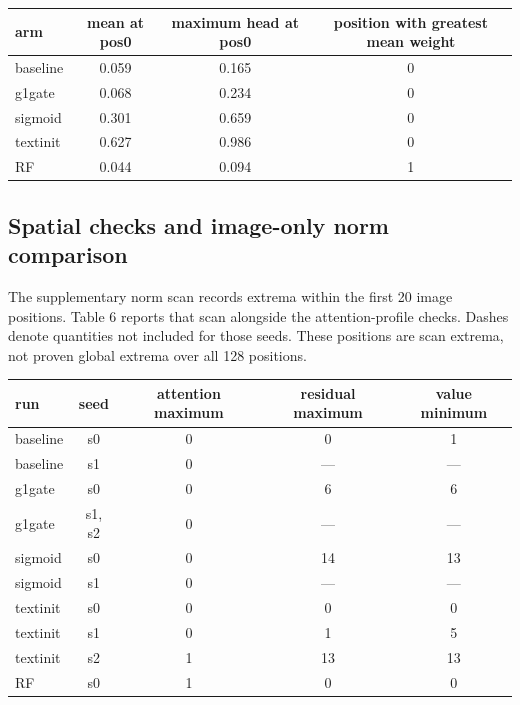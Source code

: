 \documentclass{article}
\begin{document}
\begin{center}
\begin{minipage}{\linewidth}
\makeatletter{}\makeatother
  \centering
  \small
  \caption{\textbf{Raw first-position attention in checkpoint reprobes, seed 0.}}
  \begin{tabular}{lccc}
    \toprule
    arm & mean at pos0 & maximum head at pos0 & position with greatest mean weight \\
    \midrule
    baseline & 0.059 & 0.165 & 0 \\
    g1gate & 0.068 & 0.234 & 0 \\
    sigmoid & 0.301 & 0.659 & 0 \\
    textinit & 0.627 & 0.986 & 0 \\
    RF & 0.044 & 0.094 & 1 \\
    \bottomrule
  \end{tabular}
\end{minipage}
\end{center}

\subsection{Spatial checks and image-only norm comparison}

The supplementary norm scan records extrema within the first 20 image positions. Table 6 reports that scan alongside the attention-profile checks. Dashes denote quantities not included for those seeds. These positions are scan extrema, not proven global extrema over all 128 positions.

\begin{center}
\begin{minipage}{\linewidth}
\makeatletter{}\makeatother
  \centering
  \small
  \caption{\textbf{Positions of attention maxima and norm extrema in supplementary scans.}}
  \begin{tabular}{lcccc}
    \toprule
    run & seed & attention maximum & residual maximum & value minimum \\
    \midrule
    baseline & s0 & 0 & 0 & 1 \\
    baseline & s1 & 0 & --- & --- \\
    g1gate & s0 & 0 & 6 & 6 \\
    g1gate & s1, s2 & 0 & --- & --- \\
    sigmoid & s0 & 0 & 14 & 13 \\
    sigmoid & s1 & 0 & --- & --- \\
    textinit & s0 & 0 & 0 & 0 \\
    textinit & s1 & 0 & 1 & 5 \\
    textinit & s2 & 1 & 13 & 13 \\
    RF & s0 & 1 & 0 & 0 \\
    \bottomrule
  \end{tabular}
\end{minipage}
\end{center}
\end{document}
